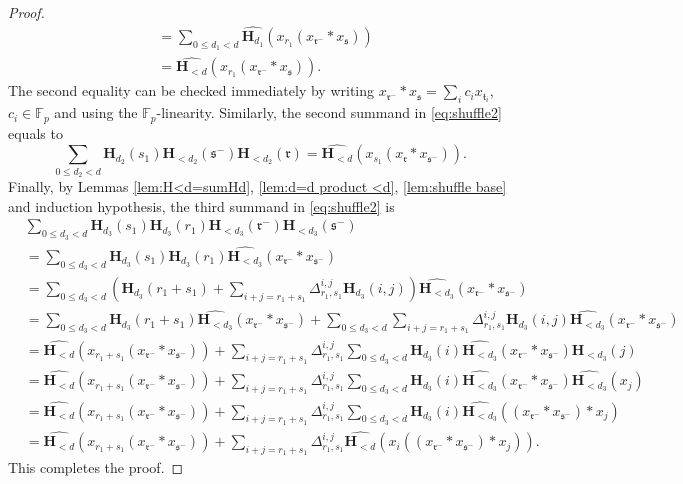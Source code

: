\documentclass[10pt,a4paper]{amsart}
\newcommand{\FF}{\mathbb{F}}
\newcommand{\ww}[1]{\mathfrak{#1}}
\renewcommand{\H}{\mathbf{H}}
\begin{document}
\begin{proof}
\begin{align*}
        &=
        \sum_{0\leq d_1<d}\widehat{\H_{d_1}}(x_{r_1}(x_{\ww{r}^-}\ast x_{\ww{s}}))
        \\
        &=\widehat{\H_{<d}}(x_{r_1}(x_{\ww{r}^-}\ast x_{\ww{s}})).
    \end{align*}
The second equality can be checked immediately by writing $x_{\ww{r}^-}\ast x_\ww{s}=\sum_{i}c_ix_{\ww{t}_i}$, $c_i\in\FF_p$ and using the $\FF_p$-linearity. Similarly, the second summand in \eqref{eq:shuffle2} equals to
    $$\sum_{0\leq d_2<d} \H_{d_2}(s_1) \H_{<d_2}(\ww{s}^-) \H_{<d_2}(\ww{r})=\widehat{\H_{<d}}(x_{s_1}(x_{\ww{r}}\ast x_{\ww{s}^-})).$$
Finally, by Lemmas \ref{lem:H<d=sumHd}, \ref{lem:d=d product <d}, \ref{lem:shuffle base} and induction hypothesis, the third summand in \eqref{eq:shuffle2} is
\begin{align*}
    &\sum_{0\leq d_3<d} \H_{d_3}(s_1) \H_{d_3}(r_1) \H_{<d_3}(\ww{r}^-) \H_{<d_3}(\ww{s}^-)\\
    &=\sum_{0\leq d_3<d}\H_{d_3}(s_1) \H_{d_3}(r_1) \widehat{\H_{<d_3}}(x_{\ww{r}^-}\ast x_{\ww{s}^-}) \\
    &=
    \sum_{0\leq d_3<d}\left(\H_{d_3}(r_1+s_1)+\sum_{{i+j=r_1+s_1}}\Delta_{r_1,s_1}^{i,j} \H_{d_3}(i,j)\right)\widehat{\H_{<d_3}}(x_{\ww{r}^-}\ast x_{\ww{s}^-})\\
    &=
    \sum_{0\leq d_3<d}\H_{d_3}(r_1+s_1)\widehat{\H_{<d_3}}(x_{\ww{r}^-}\ast x_{\ww{s}^-}) +\sum_{0\leq d_3<d}\sum_{{i+j=r_1+s_1}}\Delta_{r_1,s_1}^{i,j} \H_{d_3}(i,j)\widehat{\H_{<d_3}}(x_{\ww{r}^-}\ast x_{\ww{s}^-}) \\
    &=
    \widehat{\H_{<d}}(x_{r_1+s_1}(x_{\ww{r}^-}\ast x_{\ww{s}^-})) +\sum_{{i+j=r_1+s_1}}\Delta_{r_1,s_1}^{i,j}\sum_{0\leq d_3<d}\H_{d_3}(i)\widehat{\H_{<d_3}}(x_{\ww{r}^-}\ast x_{\ww{s}^-}) \H_{<d_3}(j)\\
    &=
    \widehat{\H_{<d}}(x_{r_1+s_1}(x_{\ww{r}^-}\ast x_{\ww{s}^-})) +\sum_{{i+j=r_1+s_1}}\Delta_{r_1,s_1}^{i,j}\sum_{0\leq d_3<d}\H_{d_3}(i)\widehat{\H_{<d_3}}(x_{\ww{r}^-}\ast x_{\ww{s}^-}) \widehat{\H_{<d_3}}(x_j)\\
    &=
    \widehat{\H_{<d}}(x_{r_1+s_1}(x_{\ww{r}^-}\ast x_{\ww{s}^-})) +\sum_{{i+j=r_1+s_1}}\Delta_{r_1,s_1}^{i,j}\sum_{0\leq d_3<d}\H_{d_3}(i)\widehat{\H_{<d_3}}((x_{\ww{r}^-}\ast x_{\ww{s}^-})\ast x_j)\\
    &=
    \widehat{\H_{<d}}(x_{r_1+s_1}(x_{\ww{r}^-}\ast x_{\ww{s}^-})) +\sum_{{i+j=r_1+s_1}}\Delta_{r_1,s_1}^{i,j}\widehat{\H_{<d}}(x_i((x_{\ww{r}^-}\ast x_{\ww{s}^-})\ast x_j)).
\end{align*}
This completes the proof.
\end{proof}
\end{document}
